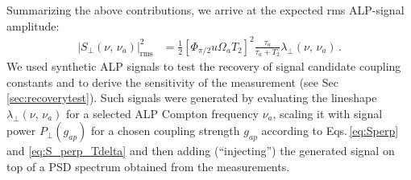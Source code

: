 Summarizing the above contributions, we arrive at the expected rms ALP-signal amplitude:
\begin{align}
    |S_{\perp} (\nu,\,\nu_a)|^2_{\mathrm{rms}}& =\frac{1}{2} [\Phi_{\pi/2} u \Omega_{a} T_2]^2 \frac{\tau_a}{\tau_a+T_2} \lambda_{\perp} (\nu,\,\nu_a) 
    \,.\label{eq:S_perp_Tdelta}
\end{align}
We used synthetic ALP signals to test the recovery of signal candidate coupling constants and to derive the sensitivity of the measurement (see Sec\,\ref{sec:recoverytest}).
Such signals were generated by evaluating the lineshape $\lambda_{\perp}(\nu,\,\nu_a)$ for a selected ALP Compton frequency $\nu_a$, scaling it with signal power $P_{\perp}(g_{ap})$ for a chosen coupling strength $g_{ap}$ according to Eqs.\,\eqref{eq:Sperp} and \eqref{eq:S_perp_Tdelta} and then adding (``injecting'') the generated signal on top of a PSD spectrum obtained from the measurements. 
